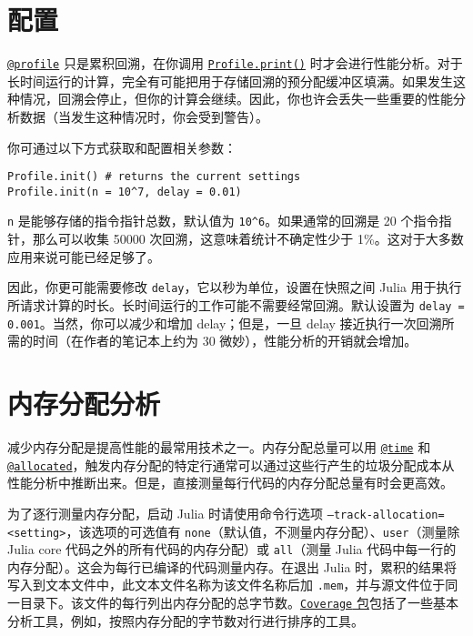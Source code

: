 \hypertarget{5894887495287635363}{}


\section{配置}



\hyperlink{9691715859147716436}{\texttt{@profile}} 只是累积回溯，在你调用 \hyperlink{2955792207246042270}{\texttt{Profile.print()}} 时才会进行性能分析。对于长时间运行的计算，完全有可能把用于存储回溯的预分配缓冲区填满。如果发生这种情况，回溯会停止，但你的计算会继续。因此，你也许会丢失一些重要的性能分析数据（当发生这种情况时，你会受到警告）。



你可通过以下方式获取和配置相关参数：




\begin{verbatim}
Profile.init() # returns the current settings
Profile.init(n = 10^7, delay = 0.01)
\end{verbatim}



\texttt{n} 是能够存储的指令指针总数，默认值为 \texttt{10{\textasciicircum}6}。如果通常的回溯是 20 个指令指针，那么可以收集 50000 次回溯，这意味着统计不确定性少于 1\%。这对于大多数应用来说可能已经足够了。



因此，你更可能需要修改 \texttt{delay}，它以秒为单位，设置在快照之间 Julia 用于执行所请求计算的时长。长时间运行的工作可能不需要经常回溯。默认设置为 \texttt{delay = 0.001}。当然，你可以减少和增加 delay；但是，一旦 delay 接近执行一次回溯所需的时间（在作者的笔记本上约为 30 微妙），性能分析的开销就会增加。



\hypertarget{10992983602239333354}{}


\section{内存分配分析}



减少内存分配是提高性能的最常用技术之一。内存分配总量可以用 \hyperlink{8029752041511656628}{\texttt{@time}} 和 \hyperlink{5377755456008435782}{\texttt{@allocated}}，触发内存分配的特定行通常可以通过这些行产生的垃圾分配成本从性能分析中推断出来。但是，直接测量每行代码的内存分配总量有时会更高效。



为了逐行测量内存分配，启动 Julia 时请使用命令行选项 \texttt{--track-allocation=<setting>}，该选项的可选值有 \texttt{none}（默认值，不测量内存分配）、\texttt{user}（测量除 Julia core 代码之外的所有代码的内存分配）或 \texttt{all}（测量 Julia 代码中每一行的内存分配）。这会为每行已编译的代码测量内存。在退出 Julia 时，累积的结果将写入到文本文件中，此文本文件名称为该文件名称后加 \texttt{.mem}，并与源文件位于同一目录下。该文件的每行列出内存分配的总字节数。\href{https://github.com/JuliaCI/Coverage.jl}{\texttt{Coverage} 包}包括了一些基本分析工具，例如，按照内存分配的字节数对行进行排序的工具。



